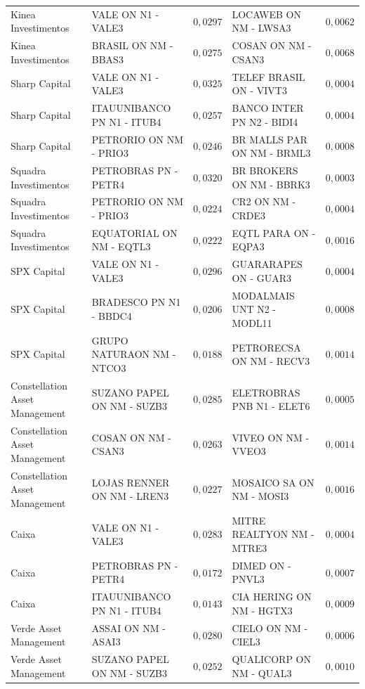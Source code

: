 \documentclass[11pt,a4paper]{article}
\begin{document}
\begin{center}
\begin{longtable}{@{}lp{3.9cm}rp{3.9cm}r@{}}
Kinea Investimentos & VALE ON N1 - VALE3 & $0{,}0297$ & LOCAWEB ON NM - LWSA3 & $0{,}0062$ \\
Kinea Investimentos & BRASIL ON NM - BBAS3 & $0{,}0275$ & COSAN ON NM - CSAN3 & $0{,}0068$ \\
Sharp Capital & VALE ON N1 - VALE3 & $0{,}0325$ & TELEF BRASIL ON - VIVT3 & $0{,}0004$ \\
Sharp Capital & ITAUUNIBANCO PN N1 - ITUB4 & $0{,}0257$ & BANCO INTER PN N2 - BIDI4 & $0{,}0004$ \\
Sharp Capital & PETRORIO ON NM - PRIO3 & $0{,}0246$ & BR MALLS PAR ON NM - BRML3 & $0{,}0008$ \\
Squadra Investimentos & PETROBRAS PN - PETR4 & $0{,}0320$ & BR BROKERS ON NM - BBRK3 & $0{,}0003$ \\
Squadra Investimentos & PETRORIO ON NM - PRIO3 & $0{,}0224$ & CR2 ON NM - CRDE3 & $0{,}0004$ \\
Squadra Investimentos & EQUATORIAL ON NM - EQTL3 & $0{,}0222$ & EQTL PARA ON - EQPA3 & $0{,}0016$ \\
SPX Capital & VALE ON N1 - VALE3 & $0{,}0296$ & GUARARAPES ON - GUAR3 & $0{,}0004$ \\
SPX Capital & BRADESCO PN N1 - BBDC4 & $0{,}0206$ & MODALMAIS UNT N2 - MODL11 & $0{,}0008$ \\
SPX Capital & GRUPO NATURAON NM - NTCO3 & $0{,}0188$ & PETRORECSA ON NM - RECV3 & $0{,}0014$ \\
Constellation Asset Management & SUZANO PAPEL ON NM - SUZB3 & $0{,}0285$ & ELETROBRAS PNB N1 - ELET6 & $0{,}0005$ \\
Constellation Asset Management & COSAN ON NM - CSAN3 & $0{,}0263$ & VIVEO ON NM - VVEO3 & $0{,}0014$ \\
Constellation Asset Management & LOJAS RENNER ON NM - LREN3 & $0{,}0227$ & MOSAICO SA ON NM - MOSI3 & $0{,}0016$ \\
Caixa & VALE ON N1 - VALE3 & $0{,}0283$ & MITRE REALTYON NM - MTRE3 & $0{,}0004$ \\
Caixa & PETROBRAS PN - PETR4 & $0{,}0172$ & DIMED ON - PNVL3 & $0{,}0007$ \\
Caixa & ITAUUNIBANCO PN N1 - ITUB4 & $0{,}0143$ & CIA HERING ON NM - HGTX3 & $0{,}0009$ \\
Verde Asset Management & ASSAI ON NM - ASAI3 & $0{,}0280$ & CIELO ON NM - CIEL3 & $0{,}0006$ \\
Verde Asset Management & SUZANO PAPEL ON NM - SUZB3 & $0{,}0252$ & QUALICORP ON NM - QUAL3 & $0{,}0010$ \\

\end{longtable}
\end{center}
\end{document}
